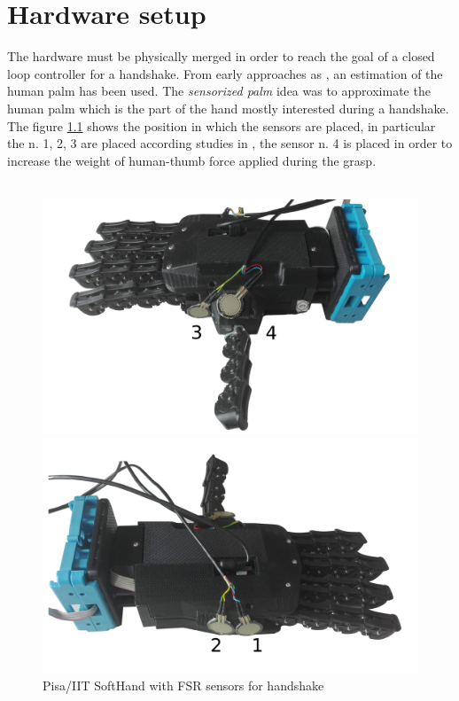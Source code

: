 \chapter{Hardware setup}
The hardware must be physically merged in order to reach the goal of a closed loop controller for a handshake. From early approaches as \cite{espen}, an estimation of the human palm has been used.  The \textit{sensorized palm} idea was to approximate the human palm which is the part of the hand mostly interested during a handshake.
The figure \ref{fig:sensorsONhand} shows the position in which the sensors are placed, in particular the n. 1, 2, 3 are placed according studies in \cite{espen}, the sensor n. 4 is placed in order to increase the weight of human-thumb force applied during the grasp.\\ \\

\begin{figure}[h]
  \centering
  \begin{minipage}[b]{0.4\textwidth}
    \includegraphics[width=\textwidth]{Figure/qbhand1.png}
    
  \end{minipage}
  \hfill
  \begin{minipage}[b]{0.4\textwidth}
    \includegraphics[width=\textwidth]{Figure/qbhand2.png}
  \end{minipage}
  \label{fig:sensorsONhand}
  \caption{Pisa/IIT SoftHand with FSR sensors for handshake}
\end{figure}

